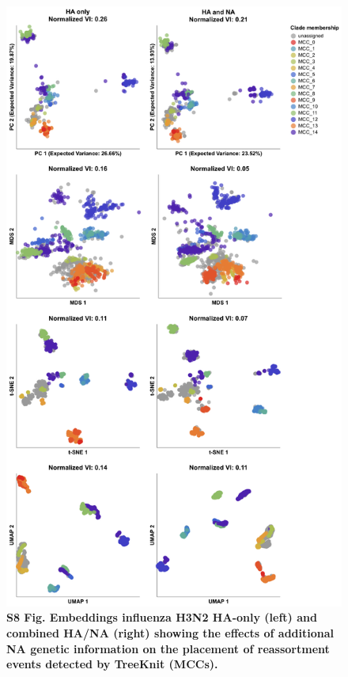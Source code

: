 \documentclass[10pt,letterpaper]{article}
\begin{document}
\begin{figure}[!h]
\includegraphics[width=0.75\columnwidth]{figures/flu-2016-2018-ha-na-all-embeddings-by-mcc.png}
\caption*{{\bf S8 Fig. Embeddings influenza H3N2 HA-only (left) and combined HA/NA (right) showing the effects of additional NA genetic information on the placement of reassortment events detected by TreeKnit (MCCs).}}
\end{figure}
\end{document}
